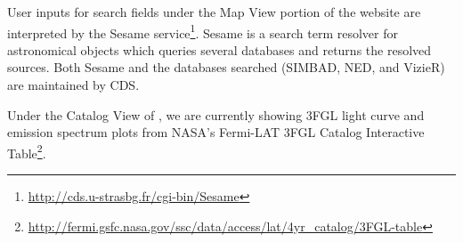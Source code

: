 User inputs for search fields under the Map View portion of the website are interpreted by the Sesame service\footnote[3]{\url{http://cds.u-strasbg.fr/cgi-bin/Sesame}}. Sesame is a search term resolver for astronomical objects which queries several databases and returns the resolved sources. Both Sesame and the databases searched (SIMBAD, NED, and VizieR) are maintained by CDS.

Under the Catalog View of \gammasky, we are currently showing 3FGL light curve and emission spectrum plots from NASA's Fermi-LAT 3FGL Catalog Interactive Table\footnote[4]{\url{http://fermi.gsfc.nasa.gov/ssc/data/access/lat/4yr_catalog/3FGL-table}}.
